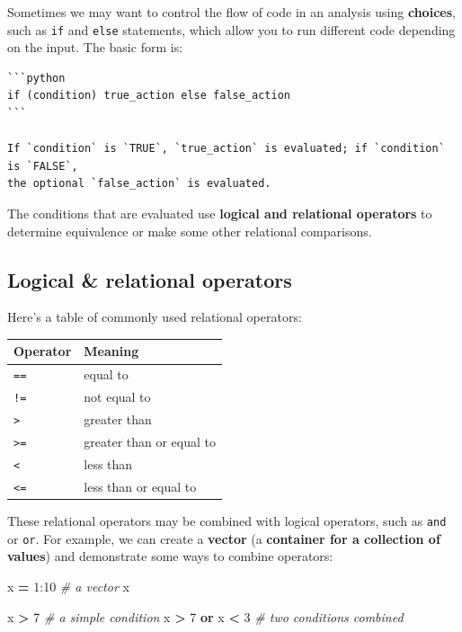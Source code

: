\documentclass[
]{book}
\newenvironment{Shaded}{\begin{snugshade}}{\end{snugshade}}
\newcommand{\CommentTok}[1]{\textcolor[rgb]{0.56,0.35,0.01}{\textit{#1}}}
\newcommand{\DecValTok}[1]{\textcolor[rgb]{0.00,0.00,0.81}{#1}}
\newcommand{\KeywordTok}[1]{\textcolor[rgb]{0.13,0.29,0.53}{\textbf{#1}}}
\newcommand{\NormalTok}[1]{#1}
\newcommand{\OperatorTok}[1]{\textcolor[rgb]{0.81,0.36,0.00}{\textbf{#1}}}
\begin{document}
Sometimes we may want to control the flow of code in an analysis using \textbf{choices},
such as \texttt{if} and \texttt{else} statements, which allow you to run different code depending on the input.
The basic form is:

\begin{verbatim}
```python
if (condition) true_action else false_action
```

If `condition` is `TRUE`, `true_action` is evaluated; if `condition` is `FALSE`,
the optional `false_action` is evaluated.
\end{verbatim}

The conditions that are evaluated use \textbf{logical and relational operators} to determine equivalence or make some other relational comparisons.

\hypertarget{logical-relational-operators-1}{%
\subsection{Logical \& relational operators}\label{logical-relational-operators-1}}

Here's a table of commonly used relational operators:

\begin{longtable}[]{@{}ll@{}}
\toprule
Operator & Meaning\tabularnewline
\midrule
\endhead
\texttt{==} & equal to\tabularnewline
\texttt{!=} & not equal to\tabularnewline
\texttt{\textgreater{}} & greater than\tabularnewline
\texttt{\textgreater{}=} & greater than or equal to\tabularnewline
\texttt{\textless{}} & less than\tabularnewline
\texttt{\textless{}=} & less than or equal to\tabularnewline
\bottomrule
\end{longtable}

These relational operators may be combined with logical operators, such as \texttt{and} or \texttt{or}.
For example, we can create a \textbf{vector} (a \textbf{container for a collection of values}) and demonstrate
some ways to combine operators:

\begin{Shaded}
\begin{Highlighting}[]
\NormalTok{x }\OperatorTok{=} \DecValTok{1}\NormalTok{:}\DecValTok{10} \CommentTok{# a vector}
\NormalTok{x}

\NormalTok{x }\OperatorTok{>} \DecValTok{7} \CommentTok{# a simple condition}
\NormalTok{x }\OperatorTok{>} \DecValTok{7} \KeywordTok{or}\NormalTok{ x }\OperatorTok{<} \DecValTok{3} \CommentTok{# two conditions combined}
\end{Highlighting}
\end{Shaded}
\end{document}
